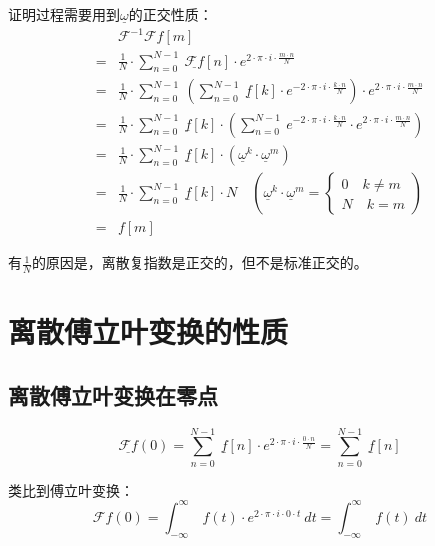 证明过程需要用到$\underline{\omega}$的正交性质：
\begin{align*}
	  & \mathcal{F}^{-1}\mathcal{F}f[m]                                                                                                                                                              \\
	= & \frac{1}{N}\cdot \sum\limits_{n=0}^{N-1}\ \underline{\mathcal{F}f}[n]\cdot e^{2\cdot \pi\cdot i\cdot \frac{m\cdot n}{N}}                                                                     \\
	= & \frac{1}{N}\cdot \sum\limits_{n=0}^{N-1}\ (\sum\limits_{n=0}^{N-1}\ \underline{f}[k]\cdot e^{-2\cdot \pi\cdot i\cdot \frac{k\cdot n}{N}})\cdot e^{2\cdot \pi\cdot i\cdot \frac{m\cdot n}{N}} \\
	= & \frac{1}{N}\cdot \sum\limits_{n=0}^{N-1}\ \underline{f}[k]\cdot (\sum\limits_{n=0}^{N-1}\ e^{-2\cdot \pi\cdot i\cdot \frac{k\cdot n}{N}}\cdot e^{2\cdot \pi\cdot i\cdot \frac{m\cdot n}{N}}) \\
	= & \frac{1}{N}\cdot \sum\limits_{n=0}^{N-1}\ \underline{f}[k]\cdot(\underline{\omega}^k\cdot \underline{\omega}^m)                                                                              \\
	= & \frac{1}{N}\cdot \sum\limits_{n=0}^{N-1}\ \underline{f}[k]\cdot N\quad (\underline{\omega}^k\cdot \underline{\omega}^m=\begin{cases}
		0\quad k\neq m \\
		N\quad k=m
	\end{cases})                                           \\
	= & f[m]
\end{align*}

有$\frac{1}{N}$的原因是，离散复指数是正交的，但不是标准正交的。

\section{离散傅立叶变换的性质}
\subsection{离散傅立叶变换在零点}
$$
	\underline{\mathcal{F}f}(0)=\sum\limits_{n=0}^{N-1}\ \underline{f}[n]\cdot e^{2\cdot \pi\cdot i\cdot \frac{0\cdot n}{N}}=\sum\limits_{n=0}^{N-1}\ \underline{f}[n]
$$

类比到傅立叶变换：
$$
	\mathcal{F}f(0)=\int_{-\infty}^\infty\ f(t)\cdot e^{2\cdot \pi\cdot i\cdot 0\cdot t}\ dt=\int_{-\infty}^\infty\ f(t)\ dt
$$
